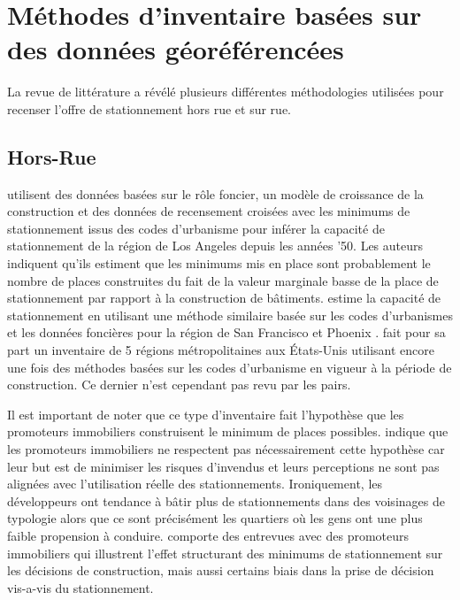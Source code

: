 \section{Méthodes d'inventaire basées sur des données géoréférencées}
  La revue de littérature a révélé plusieurs différentes méthodologies utilisées pour recenser l'offre de stationnement hors rue et sur rue. 

  \subsection{Hors-Rue}
  \textcite{Chester:ParkingInfrastructure:2015} utilisent des données basées sur le rôle foncier, un modèle de croissance de la construction et des données de recensement croisées avec les minimums de stationnement issus des codes d'urbanisme pour inférer la capacité de stationnement de la région de Los Angeles depuis les années '50. Les auteurs indiquent qu'ils estiment que les minimums mis en place sont probablement le nombre de places construites du fait de la valeur marginale basse de la place de stationnement par rapport à la construction de bâtiments. \citeauthor{Chester:InventoryingSan:2022} estime la capacité de stationnement en utilisant une méthode similaire basée sur les codes d'urbanismes et les données foncières pour la région de San Francisco \parencite{Chester:InventoryingSan:2022} et Phoenix \parencite{Hoehne:ValleySundrenched:2019}. \textcite{Scharnhorst:QuantifiedParking:2018} fait pour sa part un inventaire de 5 régions métropolitaines aux États-Unis utilisant encore une fois des méthodes basées sur les codes d'urbanisme en vigueur à la période de construction. Ce dernier n'est cependant pas revu par les pairs. \par 
  Il est important de noter que ce type d'inventaire fait l'hypothèse que les promoteurs immobiliers construisent le minimum de places possibles. \textcite{Stangl:ParkingLots:2019} indique que les promoteurs immobiliers ne respectent pas nécessairement cette hypothèse car leur but est de minimiser les risques d'invendus et leurs perceptions ne sont pas alignées avec l'utilisation réelle des stationnements. Ironiquement, les développeurs ont tendance à bâtir plus de stationnements dans des voisinages de typologie  \fg{} \parencite{Voulgaris:SynergisticNeighborhood:2017} alors que ce sont précisément les quartiers où les gens ont une plus faible propension à conduire. \textcite{Stangl:ParkingLots:2019} comporte des entrevues avec des promoteurs immobiliers qui illustrent l'effet structurant des minimums de stationnement sur les décisions de construction, mais aussi certains biais dans la prise de décision vis-a-vis du stationnement.


